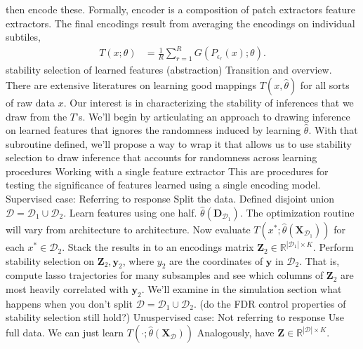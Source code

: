 \documentclass[11pt]{article}
\begin{document}
\begin{outline}
    then encode these. Formally, encoder is a composition of patch extractors
    feature extractors. The final encodings result from averaging the encodings on
    individual subtiles,
    \begin{align}
      T\left(x; \theta\right) &= \frac{1}{R}\sum_{r = 1}^{R} G\left(P_{\epsilon_{r}}\left(x\right); \theta\right).
    \end{align}
\1 stability selection of learned features (abstraction)
  \2 Transition and overview. There are extensive literatures on learning good
  mappings $T\left(x, \hat{\theta}\right)$ for all sorts of raw data $x$. Our
  interest is in characterizing the stability of inferences that we draw from
  the $T$'s.
    \3 We'll begin by articulating an approach to drawing inference on learned
    features that ignores the randomness induced by learning $\hat{\theta}$.
    \3 With that subroutine defined, we'll propose a way to wrap it that allows
    us to use stability selection to draw inference that accounts for randomness
    across learning procedures
  \2 Working with a single feature extractor
    \3 This are procedures for testing the significance of features learned
    using a single encoding model.
    \3 Supervised case: Referring to response
      \4 Split the data. Defined disjoint union $\mathcal{D} = \mathcal{D}_{1} \cup \mathcal{D}_{2}$.
      \4 Learn features using one half.
      $\hat{\theta}\left(\mathbf{D}_{\mathcal{D}_{1}}\right)$. The optimization
      routine will vary from architecture to architecture.
      \4 Now evaluate $T\left(x^{\ast};
      \hat{\theta}\left(\mathbf{X}_{\mathcal{D}_{1}}\right)\right)$ for each
      $x^{\ast} \in \mathcal{D}_{2}$. Stack the results in to an encodings
      matrix $\mathbf{Z}_{2} \in \mathbb{R}^{\left|\mathcal{D}_{1}\right| \times
        K}$.
      \4 Perform stability selection on $\mathbf{Z}_{2}, \mathbf{y}_{2}$, where
      $y_{2}$ are the coordinates of $\mathbf{y}$ in $\mathcal{D}_{2}$. That is,
      compute lasso trajectories for many subsamples and see which columns of
      $\mathbf{Z}_{2}$ are most heavily correlated with $\mathbf{y}_{2}$.
      \4 We'll examine in the simulation section what happens when you don't
      split $\mathcal{D} = \mathcal{D}_{1} \cup \mathcal{D}_{2}$. (do the FDR
      control properties of stability selection still hold?)
    \3 Unuspervised case: Not referring to response
      \4 Use full data. We can just learn $T\left(\cdot;
      \hat{\theta}\left(\mathbf{X}_{\mathcal{D}}\right)\right)$
      \4 Analogously, have $\mathbf{Z} \in \mathbb{R}^{\left|\mathcal{D}\right| \times K}$.

\end{outline}
\end{document}
